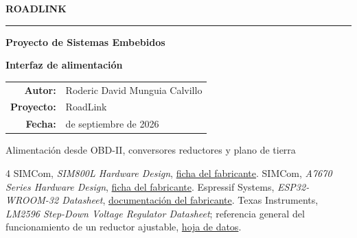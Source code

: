 \documentclass[11pt,letterpaper]{article}
\begin{document}
\begin{titlepage}
  \pagecolor{RoadLight}
  \begin{center}
    \vspace*{1.0cm}
    {\sffamily\bfseries\fontsize{20}{24}\selectfont\color{RoadTeal} ROADLINK}\par
    \vspace{0.35cm}
    {\color{RoadTeal}\rule{0.82\textwidth}{2.2pt}}\par
    \vfill
    {\sffamily\bfseries\fontsize{28}{34}\selectfont\color{RoadGreen} Proyecto de Sistemas Embebidos}\par
    \vspace{0.35cm}
    {\sffamily\bfseries\fontsize{38}{44}\selectfont\color{RoadBlue} Interfaz de alimentación}\par
    \vspace{0.8cm}
    \vfill
    \begin{tabular}{>{\sffamily\bfseries}r >{\sffamily}l}
      Autor: & Roderic David Munguia Calvillo \\
      Proyecto: & RoadLink \\
      Fecha: & 29 de septiembre de 2026 \\
    \end{tabular}
    \vfill
    \begin{minipage}{0.82\textwidth}
      \centering
      \colorbox{RoadGreen}{\parbox{0.94\textwidth}{\centering\color{white}\sffamily\small
        Alimentación desde OBD-II, conversores reductores y plano de tierra}}
    \end{minipage}
    \vspace*{0.8cm}
  \end{center}
\end{titlepage}
\nopagecolor

\tableofcontents

\begin{thebibliography}{4}
 SIMCom, \emph{SIM800L Hardware Design},
\href{https://cn.simcom.com/product/SIM800L.html}{ficha del fabricante}.
 SIMCom, \emph{A7670 Series Hardware Design},
\href{https://en.simcom.com/product/A7670X.html}{ficha del fabricante}.
 Espressif Systems, \emph{ESP32-WROOM-32 Datasheet},
\href{https://documentation.espressif.com/esp32-wroom-32_datasheet_en.html}{documentación del fabricante}.
 Texas Instruments, \emph{LM2596 Step-Down Voltage Regulator
Datasheet}; referencia general del funcionamiento de un reductor ajustable,
\href{https://www.ti.com/lit/ds/symlink/lm2596.pdf}{hoja de datos}.
\end{thebibliography}
\end{document}
